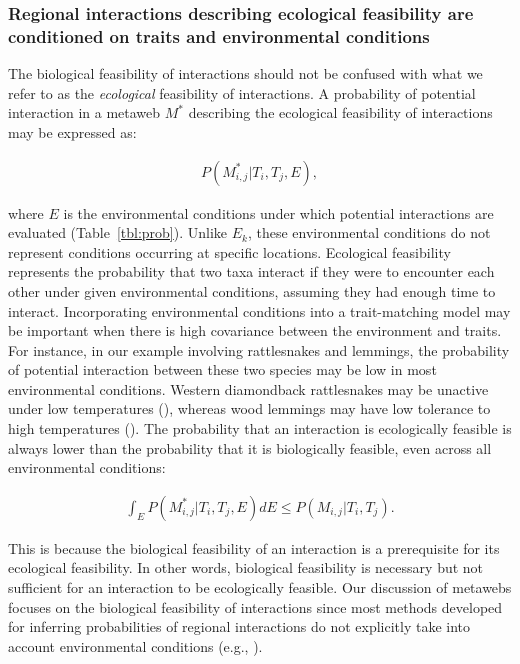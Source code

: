 \subsubsection{Regional interactions describing ecological feasibility are conditioned on traits and environmental conditions}

The biological feasibility of interactions should not be confused with what we
refer to as the \textit{ecological} feasibility of interactions. A probability
of potential interaction in a metaweb $M^*$ describing the ecological
feasibility of interactions may be expressed as: 

\begin{eqnarray}
  \label{eq:metaweb2}
  P(M^*_{i, j} | T_i, T_j, E),
\end{eqnarray}

where $E$ is the environmental conditions under which potential interactions are
evaluated (Table~\ref{tbl:prob}). Unlike $E_k$, these environmental conditions
do not represent conditions occurring at specific locations. Ecological
feasibility represents the probability that two taxa interact if they were to
encounter each other under given environmental conditions, assuming they had
enough time to interact. Incorporating environmental conditions into a
trait-matching model may be important when there is high covariance between the
environment and traits. For instance, in our example involving rattlesnakes and
lemmings, the probability of potential interaction between these two species may
be low in most environmental conditions. Western diamondback rattlesnakes may be
unactive under low temperatures (\cite{Kissner1997Rattling}), whereas wood
lemmings may have low tolerance to high temperatures
(\cite{Kausrud2008Linking}). The probability that an interaction is ecologically
feasible is always lower than the probability that it is biologically feasible,
even across all environmental conditions: 

\begin{eqnarray}
  \label{eq:feasibility}
  \int_{E}P(M^*_{i, j} | T_i, T_j, E) dE \leq P(M_{i, j} |
T_i, T_j).
\end{eqnarray}

This is because the biological feasibility of an interaction is a prerequisite
for its ecological feasibility. In other words, biological feasibility is
necessary but not sufficient for an interaction to be ecologically feasible. Our
discussion of metawebs focuses on the biological feasibility of interactions
since most methods developed for inferring probabilities of regional
interactions do not explicitly take into account environmental conditions (e.g.,
\cite{Strydom2022Food}). 

